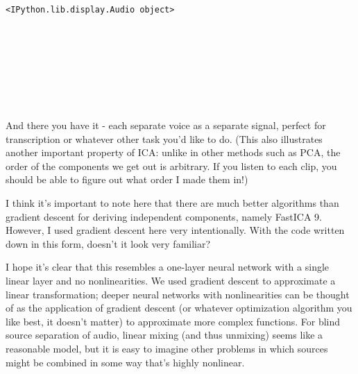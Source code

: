 \documentclass[11pt]{article}
\begin{document}
    
    
    \begin{verbatim}
<IPython.lib.display.Audio object>
    \end{verbatim}

    
    \begin{center}
    \end{center}
    { \hspace*{\fill} \\}
    
    \begin{center}
    \end{center}
    { \hspace*{\fill} \\}
    
    \begin{center}
    \end{center}
    { \hspace*{\fill} \\}
    
    \begin{center}
    \end{center}
    { \hspace*{\fill} \\}
    
    And there you have it - each separate voice as a separate signal,
perfect for transcription or whatever other task you'd like to do. (This
also illustrates another important property of ICA: unlike in other
methods such as PCA, the order of the components we get out is
arbitrary. If you listen to each clip, you should be able to figure out
what order I made them in!)

    I think it's important to note here that there are much better
algorithms than gradient descent for deriving independent components,
namely FastICA 9. However, I used gradient descent here very
intentionally. With the code written down in this form, doesn't it look
very familiar?

I hope it's clear that this resembles a one-layer neural network with a
single linear layer and no nonlinearities. We used gradient descent to
approximate a linear transformation; deeper neural networks with
nonlinearities can be thought of as the application of gradient descent
(or whatever optimization algorithm you like best, it doesn't matter) to
approximate more complex functions. For blind source separation of
audio, linear mixing (and thus unmixing) seems like a reasonable model,
but it is easy to imagine other problems in which sources might be
combined in some way that's highly nonlinear.
\end{document}
